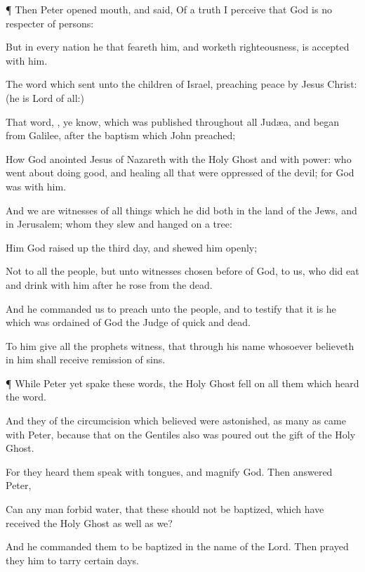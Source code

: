{\par }{\PP {}¶
Then
Peter
opened
{}
mouth, and
said,
Of a
truth I
perceive
that
God
is
no respecter of
persons:

But
in
every
nation
he that
feareth
him,
and
worketh
righteousness,
is
accepted with
him.

The
word
which
{}
sent unto the
children of
Israel,
preaching
peace
by
Jesus
Christ: (he
is
Lord of
all:)

That
word,
{},
ye
know, which was
published
throughout
all
Judæa, and
began
from
Galilee,
after the
baptism
which
John
preached;

How
God
anointed
Jesus
of
Nazareth with the
Holy
Ghost
and with
power:
who went
about doing
good,
and
healing
all
that were
oppressed
of the
devil;
for
God
was
with
him.

And
we
are
witnesses of all
things
which he
did
both
in the
land of the
Jews,
and
in
Jerusalem;
whom they
slew and
hanged
on a
tree:

Him
God raised
up the
third
day,
and
shewed
him
openly;

Not to
all the
people,
but unto
witnesses chosen
before
of
God,
{} to
us,
who did
eat
and drink
with
him
after
he
rose
from the
dead.

And he
commanded
us to
preach unto the
people,
and to
testify
that
it
is he
which was
ordained
of
God
{} the
Judge of
quick
and
dead.

To
him
give
all the
prophets
witness, that
through
his
name
whosoever
believeth
in
him shall
receive
remission of
sins.


\par }{\PP {}¶ While
Peter
yet
spake
these
words, the
Holy
Ghost
fell
on
all
them which
heard the
word.

And
they
of the
circumcision which
believed were
astonished, as many
as
came with
Peter, because
that
on the
Gentiles
also was poured
out the
gift of the
Holy
Ghost.

For they
heard
them
speak with
tongues,
and
magnify
God.
Then
answered
Peter,

Can any
man
forbid
water,
that
these
should
not be
baptized,
which have
received the
Holy
Ghost as
well
as
we?

And he
commanded
them to be
baptized
in the
name of the
Lord.
Then prayed
they
him to
tarry
certain
days.




}
